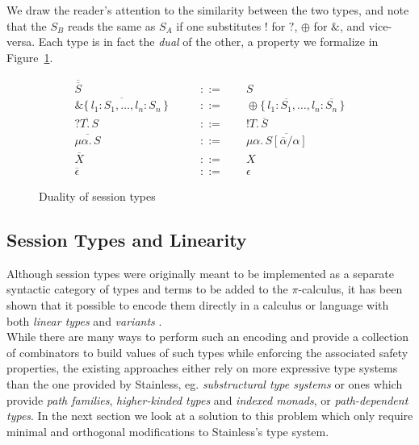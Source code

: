 \documentclass[a4paper,twoside]{article}
\newcommand{\RefFig}[1]{Figure~\ref{#1}}
\begin{document}
We draw the reader's attention to the similarity between the two types, and note that the $S_B$ reads the same as $S_A$ if one substitutes $!$ for $?$, $\oplus$ for $\&$, and vice-versa. Each type is in fact the \textit{dual} of the other, a property we formalize in \RefFig{fig:dual}.\\

\begin{figure}
{\large
\begin{align*}
\overline{\overline{S}}\qquad&::=\qquad S\\
\overline{\&\{\,l_1: S_1, \ldots, l_n: S_n\,\}}\qquad&::=\qquad\oplus\{\,l_1: \overline{S_1}, \ldots, l_n: \overline{S_n}\,\}\\
\overline{?T.\, S} \qquad&::=\qquad !T.\, \overline{S}\\
\overline{\mu\alpha.\, S} \qquad&::=\qquad \mu\alpha.\, \overline{S[\overline{\alpha}/\alpha]}\\
\overline{X} \qquad&::=\qquad X\\
\overline{\epsilon} \qquad&::=\qquad \epsilon
\end{align*}
}%
\vspace{-20pt}
\caption{Duality of session types \label{fig:dual}}
\end{figure}

\subsection{Session Types and Linearity}

Although session types were originally meant to be implemented as a separate syntactic category of types and terms to be added to the $\pi$-calculus, it has been shown that it possible to encode them directly in a calculus or language with both \textit{linear types} and \textit{variants} \cite{Wadler:2012:PS:2364527.2364568, Dardha:2012:STR:2370776.2370794}.\\

While there are many ways to perform such an encoding and provide a collection of combinators to build values of such types while enforcing the associated safety properties, the existing approaches \cite{st_lin_haskell, Jespersen:2015:STR:2808098.2808100} either rely on more expressive type systems than the one provided by Stainless, eg. \textit{substructural type systems} or ones which provide \textit{path families}, \textit{higher-kinded types} and \textit{indexed monads}, or \textit{path-dependent types}. In the next section we look at a solution to this problem which only require minimal and orthogonal modifications to Stainless's type system.
\end{document}
